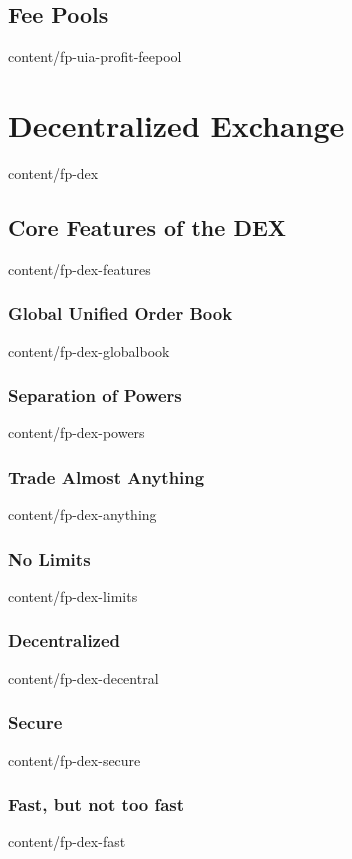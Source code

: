 \documentclass[conference,final,10pt,a4paper]{IEEEtran}
\begin{document}
\subsection    { Fee Pools                                       }  { content/fp-uia-profit-feepool  } 

\section       { Decentralized Exchange                          }  { content/fp-dex                 } 
\subsection    { Core Features of the DEX                        }  { content/fp-dex-features        }
\subsubsection { Global Unified Order Book                       }  { content/fp-dex-globalbook      } 
\subsubsection { Separation of Powers                            }  { content/fp-dex-powers          } 
\subsubsection { Trade Almost Anything                           }  { content/fp-dex-anything        } 
\subsubsection { No Limits                                       }  { content/fp-dex-limits          } 
\subsubsection { Decentralized                                   }  { content/fp-dex-decentral       } 
\subsubsection { Secure                                          }  { content/fp-dex-secure          } 
\subsubsection { Fast, but not too fast                          }  { content/fp-dex-fast            } 
\end{document}
